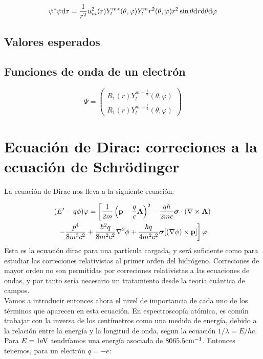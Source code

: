 \begin{equation}
    \psi^* \psi \mathrm{d} \tau = \frac{1}{r^2} u_{nl}^2 (r) Y_l^{m*} (\theta , \varphi)  Y_l^m r^2 (\theta , \varphi) r^2 \sin \theta \mathrm{d} r \mathrm{d} \theta \mathrm{d} \varphi
\end{equation}


\subsection{Valores esperados}

\subsection{Funciones de onda de un electrón}

\begin{equation}
    \Psi = \begin{pmatrix}
    R_1 (r) Y_l^{m-\frac{1}{2}} (\theta,\varphi) \\
    R_1 (r) Y_l^{m+\frac{1}{2}} (\theta,\varphi) 
    \end{pmatrix}
\end{equation}



\section{Ecuación de Dirac: correciones a la ecuación de Schrödinger}


La ecuación de Dirac nos lleva a la siguiente ecuación:

\begin{multline}
    (E'-q\phi) \varphi = \left[ \frac{1}{2m} \left( \mathbf{p}-\frac{q}{c}\mathbf{A} \right)^2 - \frac{q\hbar}{2mc} \boldsymbol{\sigma} \cdot (\nabla \times \mathbf{A})  \right. \\
    \left. - \frac{p^4}{8 m^3 c^2} + \frac{\hbar^2 q}{8 m^2 c^2} \nabla^2 \phi + \frac{ \hbar q}{4m^2 c^2} \boldsymbol{\sigma} [(\nabla \phi)\times \mathbf{p}] \right] \varphi
    \label{Ec:01-03-15}
\end{multline}
Esta es la ecuación dirac para una partícula cargada, y será suficiente como para estudiar las correciones relativistas al primer orden del hidrógeno. Correciones de mayor orden no son permitidas por correciones relativistas a las ecuaciones de ondas, y por tanto sería necesario un tratamiento desde la teoría cuántica de campos. \\

Vamos a introducir entonces ahora el nivel de importancia de cada uno de los términos que aparecen en esta ecuación. En espectroscopía atómica, es común trabajar con la inversa de los centímetros como una medida de energía, debido a la relación entre la energía y la longitud de onda, segun la ecuación $1/\lambda = E/hc$. Para $E=1\text{eV}$ tendríamos una energía asociada de $8065.5 \text{cm}^{-1}$. Entonces tenemos, para un electrón $q=-e$:

